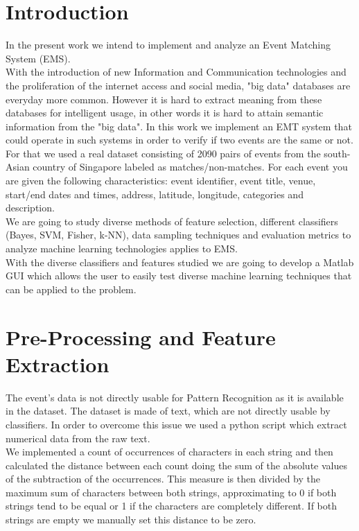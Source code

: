 \documentclass[english, a4paper, 12pt]{article}
\newcommand{\tab}{\hspace*{2em}}
\begin{document}
\section{Introduction}
\tab In the present work we intend to implement and analyze an Event Matching System (EMS).\smallskip\\
\tab With the introduction of new Information and Communication technologies and the proliferation of the internet access and social media, "big data" databases are everyday more common. However it is hard to extract meaning from these databases for intelligent usage, in other words it is hard to attain semantic information from the "big data". In this work we implement an EMT system that could operate in such systems in order to verify if two events are the same or not.\smallskip\\
\tab For that we used a real dataset consisting of 2090 pairs of events from the south-Asian country of Singapore labeled as matches/non-matches. For each event you are given the following characteristics: event identifier, event title, venue, start/end dates and times, address, latitude, longitude, categories and description.\smallskip\\
\tab We are going to study diverse methods of feature selection, different classifiers (Bayes, SVM, Fisher, k-NN), data sampling techniques and evaluation metrics to analyze machine learning technologies applies to EMS.\\
\tab With the diverse classifiers and features studied we are going to develop a Matlab GUI which allows the user to easily test diverse machine learning techniques that can be applied to the problem. \smallskip\\
\pagebreak


\section{Pre-Processing and Feature Extraction}
\tab The event's data is not directly usable for Pattern Recognition as it is available in the dataset. The dataset is made of text, which are not directly usable by classifiers.
In order to overcome this issue we used a python script which extract numerical data from the raw text.\\

\tab  {\bf Distance between characters - }We implemented a count of occurrences of characters in each string and then calculated the distance between each count doing the sum of the absolute values of the subtraction of the occurrences. This measure is then divided by the maximum sum of characters between both strings, approximating to 0 if both strings tend to be equal or 1 if the characters are completely different. If both strings are empty we manually set this distance to be zero.\medskip\\
\end{document}
